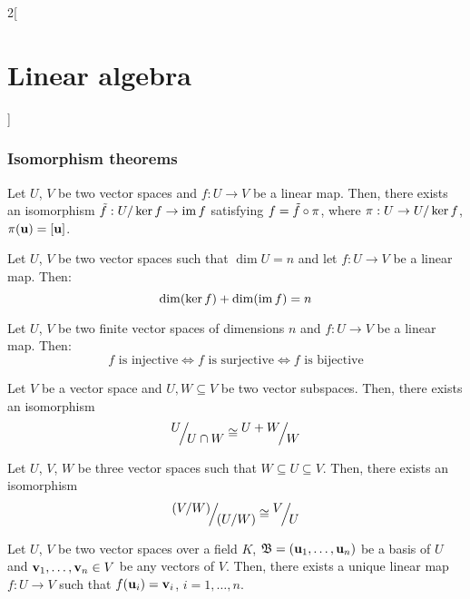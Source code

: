 \documentclass[../../../main.tex]{subfiles}
\begin{document}
\begin{multicols}{2}[\section{Linear algebra}]
  \subsubsection{Isomorphism theorems}
  \begin{theorem}
    Let $U$, $V$ be two vector spaces and $f:U\rightarrow V$ be a linear map. Then, there exists an isomorphism $\Tilde{f}:\quot{U}{\ker f}\rightarrow \im f$ satisfying $f=\Tilde{f}\circ\pi$, where $\pi:U\rightarrow \quot{U}{\ker f}$, $\pi(\boldsymbol{\mathrm{u}})=[\boldsymbol{\mathrm{u}}]$.
    \begin{center}
      \begin{minipage}{\linewidth}
        \centering
        
      \end{minipage}
    \end{center}
  \end{theorem}
  \begin{corollary}
    Let $U$, $V$ be two vector spaces such that $\dim U=n$ and let $f:U\rightarrow V$ be a linear map. Then: $$\dim(\ker f)+\dim(\operatorname{im} f)=n$$
  \end{corollary}
  \begin{corollary}
    Let $U$, $V$ be two finite vector spaces of dimensions $n$ and $f:U\rightarrow V$ be a linear map. Then: $$f\text{ is injective}\iff f\text{ is surjective}\iff f\text{ is bijective}$$
  \end{corollary}
  \begin{theorem}
    Let $V$ be a vector space and $U,W\subseteq V$ be two vector subspaces. Then, there exists an isomorphism $$\quot{U}{U\cap W}\cong\quot{U+W}{W}$$
  \end{theorem}
  \begin{theorem}
    Let $U$, $V$, $W$ be three vector spaces such that $W\subseteq U\subseteq V$. Then, there exists an isomorphism $$\quot{{(\textstyle\quot{V}{W})}}{{(\textstyle\quot{U}{W})}}\cong\quot{V}{U}$$
  \end{theorem}
  \begin{theorem}
    Let $U$, $V$ be two vector spaces over a field $K$, $\mathfrak{B}=(\boldsymbol{\mathrm{u}}_1,\ldots,\boldsymbol{\mathrm{u}}_n)$ be a basis of $U$ and $\boldsymbol{\mathrm{v}}_1,\ldots,\boldsymbol{\mathrm{v}}_n\in V$ be any vectors of $V$. Then, there exists a unique linear map $f:U\rightarrow V$ such that $f(\boldsymbol{\mathrm{u}}_i)=\boldsymbol{\mathrm{v}}_i$, $i=1,\ldots,n$.
  \end{theorem}

\end{multicols}
\end{document}
